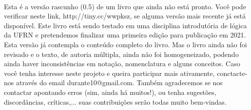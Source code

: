 \thispagestyle{empty}
\onecolumn
\ 
\vfill

\parbox{3 in}{
Esta é a versão rascunho (0.5) de um livro que ainda não está pronto.
Você pode verificar neste link, \hbox{http://tiny.cc/wwpksz}, se alguma versão mais recente já está disponível.
Este livro está sendo testado em uma disciplina introdutória de lógica da UFRN e pretendemos finalizar uma primeira edição para publicação em 2021. 
Esta versão já contempla o conteúdo completo do livro.
Mas o livro ainda não foi revisado e o texto, de autoria múltipla, ainda não foi homogeneizado, podendo ainda haver inconsistências em notação, nomenclatura e alguns conceitos.
Caso você tenha interesse neste projeto e queira participar mais ativamente, conctacte-nos através do email durante10@gmail.com. 
Também agradecemos se nos contactar apontando  erros (sim, ainda há muitos!), ou tenha sugestões, discordâncias, críticas,... suas contribuições serão todas muito bem-vindas.

}

\vfill

\parbox{3 in}{

}
\vfill
